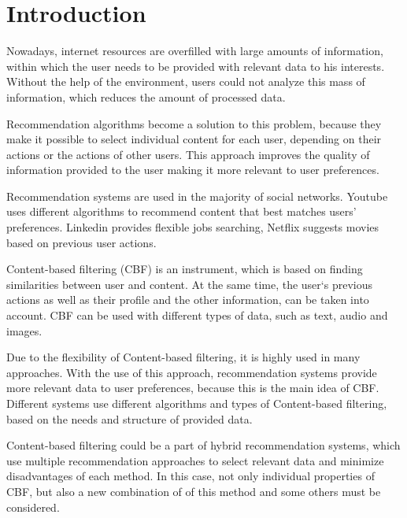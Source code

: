 \section{Introduction}\label{sec:introduction}
Nowadays, internet resources are overfilled with large amounts of information, within which the user needs to be provided with relevant data to his interests. Without the help of the environment, users could not analyze this mass of information, which reduces the amount of processed data\cite{InternetBigData}.

Recommendation algorithms become a solution to this problem, because they make it possible to select individual content for each user, depending on their actions or the actions of other users. This approach improves the quality of information provided to the user making it more relevant to user preferences\cite{IMRSUCBF}.

Recommendation systems are used in the majority of social networks. Youtube uses different algorithms to recommend content that best matches users' preferences. Linkedin provides flexible jobs searching, Netflix suggests movies based on previous user actions\cite{CBF_In_Social_Networks}.

Content-based filtering (CBF) is an instrument, which is based on finding similarities between user and content. At the same time, the user`s previous actions as well as their profile and the other information, can be taken into account. CBF can be used with different types of data, such as text, audio and images\cite{van2000using}.

Due to the flexibility of Content-based filtering, it is highly used in many approaches. With the use of this approach, recommendation systems provide more relevant data to user preferences, because this is the main idea of CBF. Different systems use different algorithms and types of Content-based filtering, based on the needs and structure of provided data. %

Content-based filtering could be a part of hybrid recommendation systems, which use multiple recommendation approaches to select relevant data and minimize disadvantages of each method. In this case, not only individual properties of CBF, but also a new combination of of this method and some others must be considered\cite{hybrid_systems}.
